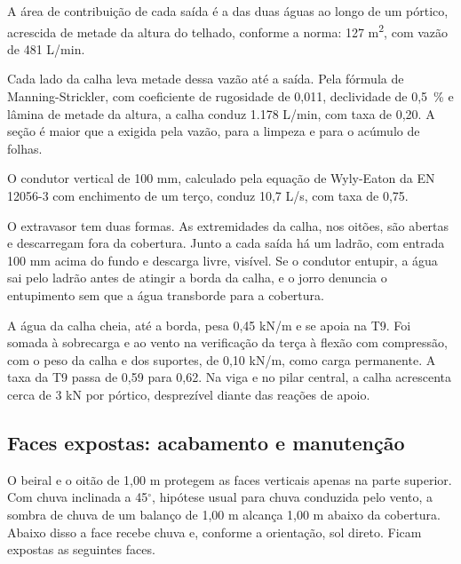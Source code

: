 \begin{alineas}
    \item A área de contribuição de cada saída é a das duas águas ao longo
          de um pórtico, acrescida de metade da altura do telhado, conforme a
          norma: 127 m\textsuperscript{2}, com vazão de 481 L/min.
    \item Cada lado da calha leva metade dessa vazão até a saída. Pela fórmula de
          Manning-Strickler, com coeficiente de rugosidade de 0,011,
          declividade de 0,5~\% e lâmina de metade da altura, a calha conduz
          1.178 L/min, com taxa de 0,20. A seção é maior que a exigida pela vazão,
          para a limpeza e para o acúmulo de folhas.
    \item O condutor vertical de 100 mm, calculado pela equação de Wyly-Eaton da
          EN 12056-3 \cite{EN12056-3:2000} com enchimento de um terço, conduz
          10,7 L/s, com taxa de 0,75.
\end{alineas}


O extravasor tem duas formas. As extremidades da calha, nos oitões, são abertas e
descarregam fora da cobertura. Junto a cada saída há um ladrão, com entrada 100 mm
acima do fundo e descarga livre, visível. Se o condutor entupir, a água sai pelo
ladrão antes de atingir a borda da calha, e o jorro denuncia o entupimento sem que
a água transborde para a cobertura.

A água da calha cheia, até a borda, pesa 0,45 kN/m e se apoia na T9. Foi somada à
sobrecarga e ao vento na verificação da terça à flexão com compressão, com o peso
da calha e dos suportes, de 0,10 kN/m, como carga permanente. A taxa da T9 passa
de 0,59 para 0,62. Na viga e no pilar central, a calha acrescenta cerca de 3 kN
por pórtico, desprezível diante das reações de apoio.

\subsection{Faces expostas: acabamento e manutenção}\label{ssec:faces-expostas}

O beiral e o oitão de 1,00 m protegem as faces verticais apenas na parte
superior. Com chuva inclinada a 45$^{\circ}$, hipótese usual para chuva conduzida
pelo vento, a sombra de chuva de um balanço de 1,00 m alcança 1,00 m abaixo da
cobertura. Abaixo disso a face recebe chuva e, conforme a orientação, sol direto.
Ficam expostas as seguintes faces.

